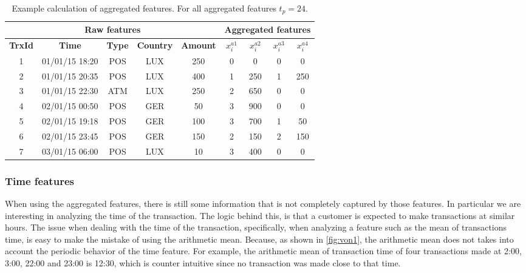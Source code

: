 	\begin{table}[!t]
		\centering
    \footnotesize
   \begin{tabular}{|c c c c c | c c c c|}
   \hline
   \multicolumn{5}{|c|}{\textbf{Raw features}} & \multicolumn{4}{c|}{\textbf{Aggregated features}} 
		\\  \hline
   \textbf{TrxId} &\textbf{Time} & \textbf{Type} & \textbf{Country} & 
	\textbf{Amount} 		& $x_i^{a1}$& $x_i^{a2}$ & $x_i^{a3}$ & $x_i^{a4}$\\
   \hline
		1&  01/01/15 18:20& POS & LUX & 250 & 0 & 0  & 0 & 0\\
		2& 01/01/15 20:35& POS & LUX & 400 & 1 & 250& 1 & 250\\
		3& 01/01/15 22:30& ATM & LUX & 250 & 2 & 650& 0 & 0\\
		4&02/01/15 00:50& POS & GER & 50 		& 3 & 900& 0& 0\\
		5& 02/01/15 19:18& POS & GER & 100 	  & 3 & 700& 1& 50\\
		6& 02/01/15 23:45& POS & GER & 150 	  & 2 & 150& 2& 150\\
		7& 03/01/15 06:00& POS & LUX & 10  & 3 & 400& 0& 0\\
   \hline
   \end{tabular}
		\caption{Example calculation of aggregated features. For all aggregated features $t_p=24$.}
		\label{tab:agg_features_example1}
  \end{table}
	
	\subsubsection{Time features}
	\label{sec:4:frad:features_time}
	
	When using the aggregated features, there is still some information that is not completely 
	captured by those features. In particular we are interesting in analyzing the time of the 
	transaction. The logic behind this, is that a customer is expected to make transactions at 
	similar hours. The issue when dealing with the time of the transaction, 
	specifically, when analyzing a feature such as the mean of transactions time, is easy 
	to make the mistake of using the arithmetic mean. Because, as shown in \figurename{ 
	\ref{fig:von1}}, the arithmetic mean does not takes into account the periodic behavior of the 
	time feature. For example, the arithmetic mean of transaction time of four transactions made at 
	2:00, 3:00, 22:00 and 23:00 is 12:30, which is counter intuitive since no transaction was made 
	close to that time. 
		
